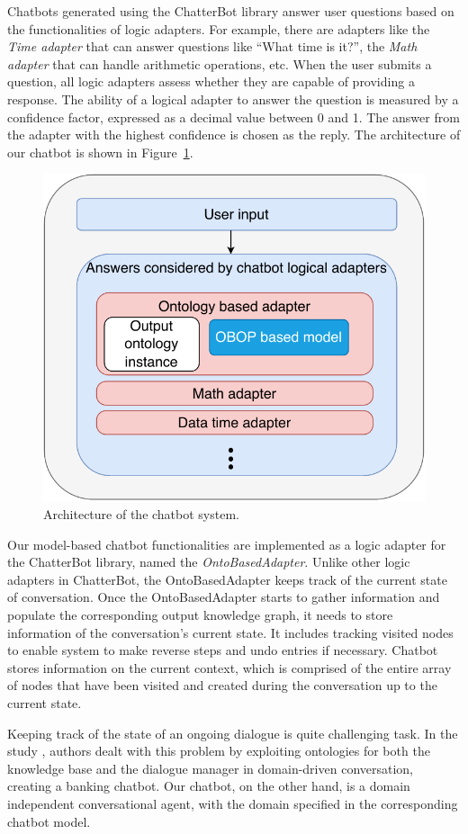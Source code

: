 \documentclass[runningheads]{llncs}
\begin{document}
Chatbots generated using the ChatterBot library answer user questions based on the functionalities of logic adapters. For example, there are adapters like the \textit{Time adapter} that can answer questions like ``What time is it?'', the \textit{Math adapter} that can handle arithmetic operations, etc. When the user submits a question, all logic adapters assess whether they are capable of providing a response. The ability of a logical adapter to answer the question is measured by a confidence factor, expressed as a decimal value between 0 and 1. The answer from the adapter with the highest confidence is chosen as the reply. The architecture of our chatbot is shown in Figure~\ref{fig:architecture}.
\begin{figure}[H]
  \centering
  \includegraphics[width=0.6\linewidth]{img/architecture}
  \caption{Architecture of the chatbot system.}
  \label{fig:architecture}
\end{figure}
Our model-based chatbot functionalities are implemented as a logic adapter for the ChatterBot library, named the \textit{OntoBasedAdapter}. Unlike other logic adapters in ChatterBot, the OntoBasedAdapter keeps track of the current state of conversation. Once the OntoBasedAdapter starts to gather information and populate the corresponding output knowledge graph, it needs to store information of the conversation's current state. It includes tracking visited nodes to enable system to make reverse steps and undo entries if necessary. Chatbot stores information on the current context, which is comprised of the entire array of nodes that have been visited and created during the conversation up to the current state. 

Keeping track of the state of an ongoing dialogue is quite challenging task.
In the study \cite{altinok2018ontology}, authors dealt with this problem by exploiting ontologies for both the knowledge base and the dialogue manager in domain-driven conversation, creating a banking chatbot. Our chatbot, on the other hand, is a domain independent conversational agent, with the domain specified in the corresponding chatbot model. 
\end{document}
